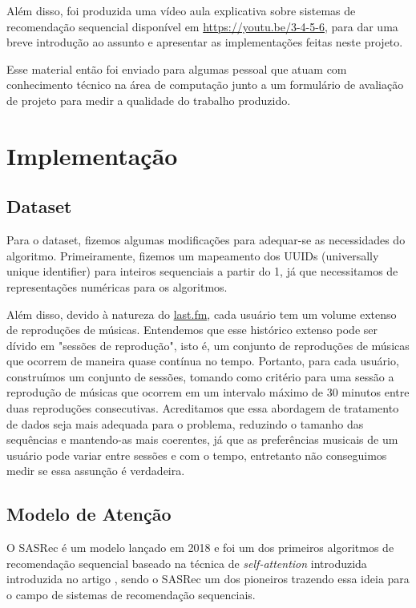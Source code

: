 Além disso, foi produzida uma vídeo aula explicativa sobre sistemas de
recomendação sequencial disponível em \url{https://youtu.be/3-4-5-6},
para dar uma breve introdução ao assunto e apresentar as implementações
feitas neste projeto.

Esse material então foi enviado para algumas pessoal que atuam com 
conhecimento técnico na área de computação junto a um formulário de
avaliação de projeto para medir a qualidade do trabalho produzido.

\section*{Implementação}

\subsection*{Dataset}

Para o dataset, fizemos algumas modificações para adequar-se
as necessidades do algoritmo. Primeiramente, fizemos um
mapeamento dos UUIDs (universally unique identifier) para inteiros
sequenciais a partir do 1, já que necessitamos de representações
numéricas para os algoritmos.

Além disso, devido à natureza do \url{last.fm}, cada usuário tem
um volume extenso de reproduções de músicas. Entendemos que esse
histórico extenso pode ser dívido em "sessões de reprodução", 
isto é, um conjunto de reproduções de músicas que ocorrem de 
maneira quase contínua no tempo. Portanto, para cada usuário,
construímos um conjunto de sessões, tomando como critério para
uma sessão a reprodução de músicas que ocorrem em um intervalo
máximo de 30 minutos entre duas reproduções consecutivas. Acreditamos
que essa abordagem de tratamento de dados seja mais adequada para
o problema, reduzindo o tamanho das sequências e mantendo-as mais
coerentes, já que as preferências musicais de um usuário pode variar
entre sessões e com o tempo, entretanto não conseguimos medir se
essa assunção é verdadeira.

\subsection*{Modelo de Atenção}

O SASRec \cite{sasrec} é um modelo lançado em 2018 e foi um dos primeiros 
algoritmos de recomendação sequencial baseado na técnica de \textit{self-attention}
introduzida introduzida no artigo  
\cite{attetionisallyouneed}, sendo o SASRec um dos pioneiros trazendo essa ideia
para o campo de sistemas de recomendação sequenciais.

